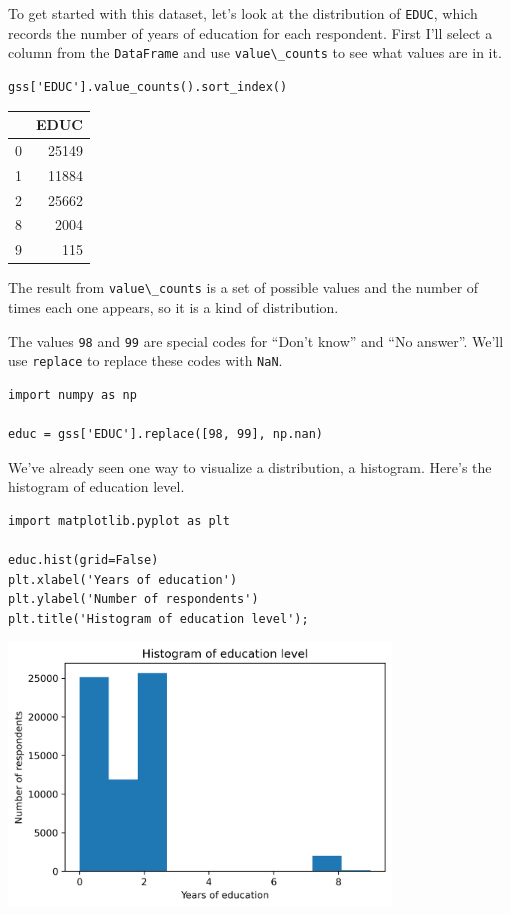To get started with this dataset, let's look at the distribution of
\passthrough{\lstinline!EDUC!}, which records the number of years of
education for each respondent. First I'll select a column from the
\passthrough{\lstinline!DataFrame!} and use
\passthrough{\lstinline!value\_counts!} to see what values are in it.

\begin{lstlisting}[]
gss['EDUC'].value_counts().sort_index()
\end{lstlisting}

\begin{tabular}{lr}
\midrule
{} &   EDUC \\
\midrule
0 &  25149 \\
1 &  11884 \\
2 &  25662 \\
8 &   2004 \\
9 &    115 \\
\midrule
\end{tabular}

The result from \passthrough{\lstinline!value\_counts!} is a set of
possible values and the number of times each one appears, so it is a
kind of distribution.

The values \passthrough{\lstinline!98!} and \passthrough{\lstinline!99!}
are special codes for ``Don't know'' and ``No answer''. We'll use
\passthrough{\lstinline!replace!} to replace these codes with
\passthrough{\lstinline!NaN!}.

\begin{lstlisting}[]
import numpy as np

educ = gss['EDUC'].replace([98, 99], np.nan)
\end{lstlisting}

We've already seen one way to visualize a distribution, a histogram.
Here's the histogram of education level.

\begin{lstlisting}[]
import matplotlib.pyplot as plt

educ.hist(grid=False)
plt.xlabel('Years of education')
plt.ylabel('Number of respondents')
plt.title('Histogram of education level');
\end{lstlisting}

\begin{center}
\includegraphics[width=4in]{chapters/08_distributions_files/08_distributions_35_0.png}
\end{center}

